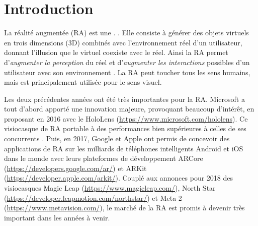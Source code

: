 \chapter*{Introduction}
\label{ch:introduction}

La réalité augmentée (RA) est une . \citep{OQLFRA2017}. Elle consiste à générer des objets virtuels en trois dimensions (3D) combinés avec l'environnement réel d'un utilisateur, donnant l'illusion que le virtuel coexiste avec le réel. Ainsi la RA permet d'\emph{augmenter la perception} du réel et d'\emph{augmenter les interactions} possibles d'un utilisateur avec son environnement \citep{Azuma1997}. La RA peut toucher tous les sens humains, mais est principalement utilisée pour le sens visuel.


Les deux précédentes années ont été très importantes pour la RA. Microsoft a tout d'abord apporté une innovation majeure, provoquant beaucoup d'intérêt, en proposant en 2016 avec le HoloLens (\url{https://www.microsoft.com/hololens}). Ce visiocasque de RA portable à des performances bien supérieures à celles de ses concurrents . Puis, en 2017, Google et Apple ont permis de concevoir des applications de RA sur les milliards de téléphones intelligents Android et iOS dans le monde avec leurs plateformes de développement ARCore (\url{https://developers.google.com/ar/}) et ARKit (\url{https://developer.apple.com/arkit/}). Couplé aux annonces pour 2018 des visiocasques Magic Leap (\url{https://www.magicleap.com/}), North Star (\url{https://developer.leapmotion.com/northstar/}) et Meta 2 (\url{https://www.metavision.com/}), le marché de la RA est promis à devenir très important dans les années à venir.


